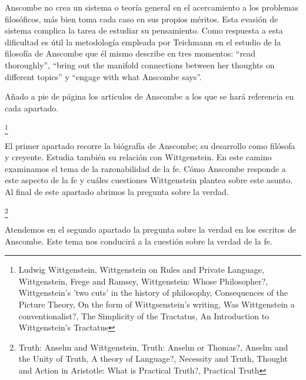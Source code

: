 \documentclass[11pt]{article}
\begin{document}
{\begin{spacing}{1.5}
\begin{spacing}{1}
Anscombe no crea un sistema o teoría general en el acercamiento a los problemas filosóficos, más bien toma cada caso en sus propios méritos. Esta evasión de sistema complica la tarea de estudiar su pensamiento. Como respuesta a esta dificultad es útil la metodología empleada por Teichmann en el estudio de la filosofía de Anscombe que él mismo describe en tres momentos: ``read thoroughly'', ``bring out the manifold connections between her thoughts on different topics'' y ``engage with what Anscombe says''.

Añado a pie de página los articulos de Anscombe a los que se hará referencia en cada apartado.

\end{spacing}
\tab{}
\footnote{
Ludwig Wittgenstein, 
Wittgenstein on Rules and Private Language, 
Wittgenstein, Frege and Ramsey, 
Wittgenstein: Whose Philosopher?, 
Wittgenstein's 'two cuts' in the history of philosophy, 
Consequences of the Picture Theory, 
On the form of Wittgsenstein's writing, 
Was Wittgenstein a conventionalist?, 
The Simplicity of the Tractatus, 
An Introduction to Wittgenstein's Tractatus
}

\begin{spacing}{1}
El primer apartado recorre la biógrafía de Anscombe; su desarrollo como filósofa y creyente. Estudia también su relación con Wittgenstein. En este camino examinamos el tema de la razonabilidad de la fe. Cómo Anscombe responde a este aspecto de la fe y cuáles cuestiones Wittgenstein plantea sobre este asunto. Al final de este apartado abrimos la pregunta sobre la verdad.
\end{spacing}

\tab{}
\footnote{
Truth: Anselm and Wittgenstein, 
Truth: Anselm or Thomas?, 
Anselm and the Unity of Truth, 
A theory of Language?, 
Necessity and Truth, 
Thought and Action in Aristotle: What is Practical Truth?, 
Practical Truth
}

\begin{spacing}{1}
Atendemos en el segundo apartado la pregunta sobre la verdad en los escritos de Anscombe. Este tema nos conducirá a la cuestión sobre la verdad de la fe.
\end{spacing}


\end{spacing}}
\end{document}
